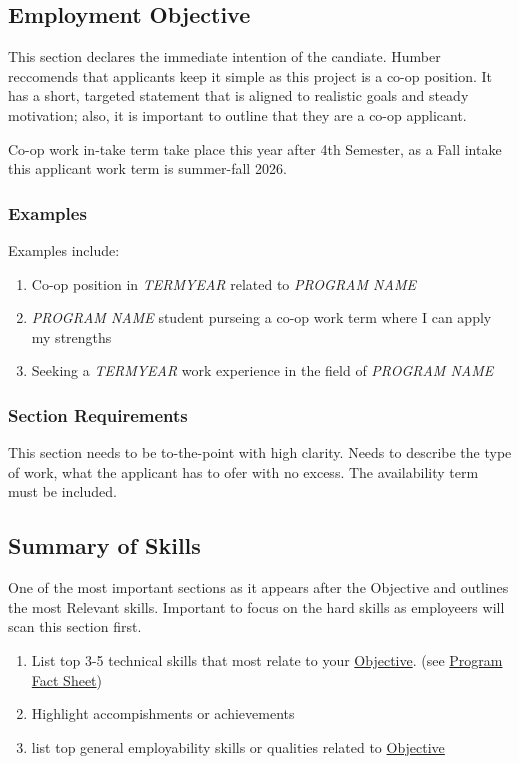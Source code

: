 \documentclass{report}
\begin{document}
	\subsection{Employment Objective}
    	\label{sec:objective} %
	This section declares the immediate intention of the candiate. Humber reccomends that applicants keep it simple as this project is a co-op position. It has a short, targeted statement that is aligned to realistic goals and steady motivation; also, it is important to outline that they are a co-op applicant.

	Co-op work in-take term take place this year after 4th Semester, as a Fall intake this applicant work term is summer-fall 2026.

	\subsubsection*{Examples}
	Examples include:
	\begin{enumerate}[label=(\alph*)] %
		\item Co-op position in \emph{TERM\/YEAR} related to \emph{PROGRAM NAME}
		\item \emph{PROGRAM NAME} student purseing a co-op work term where I can apply my strengths
		\item Seeking a \emph{TERM\/YEAR} work experience in the field of \emph{PROGRAM NAME}
	\end{enumerate}

	\subsubsection*{Section Requirements}
	This section needs to be to-the-point with high clarity. Needs to describe the type of work, what the applicant has to ofer with no excess. The availability term must be included. 

	\subsection{Summary of Skills}
    	\label{sec:summarySkill} %
	One of the most important sections as it appears after the \hypertarget{sec:objective}{Objective} and outlines the most Relevant skills. Important to focus on the hard skills as employeers will scan this section first.

	\begin{enumerate}
		\item List top 3-5 technical skills that most relate to your \hyperref[sec:objective]{Objective}. (see \hyperref[sec:factsheet]{Program Fact Sheet})
		\item Highlight accompishments or achievements
		\item list top general employability skills or qualities related to \hyperref[sec:objective]{Objective}
	\end{enumerate}
\end{document}
